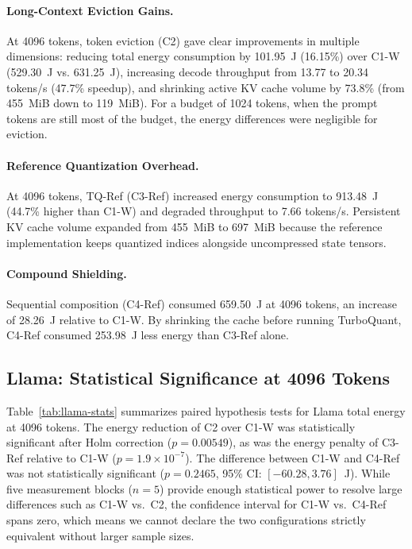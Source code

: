 \documentclass[sigconf,nonacm]{acmart}
\begin{document}
\paragraph{Long-Context Eviction Gains.}
At 4096 tokens, token eviction (C2) gave clear improvements in multiple dimensions: reducing total energy consumption by 101.95~J (16.15\%) over C1-W (529.30~J vs. 631.25~J), increasing decode throughput from 13.77 to 20.34 tokens/s (47.7\% speedup), and shrinking active KV cache volume by 73.8\% (from 455~MiB down to 119~MiB). For a budget of 1024 tokens, when the prompt tokens are still most of the budget, the energy differences were negligible for eviction.

\paragraph{Reference Quantization Overhead.}
At 4096 tokens, TQ-Ref (C3-Ref) increased energy consumption to 913.48~J (44.7\% higher than C1-W) and degraded throughput to 7.66 tokens/s. Persistent KV cache volume expanded from 455~MiB to 697~MiB because the reference implementation keeps quantized indices alongside uncompressed state tensors.

\paragraph{Compound Shielding.}
Sequential composition (C4-Ref) consumed 659.50~J at 4096 tokens, an increase of 28.26~J relative to C1-W. By shrinking the cache before running TurboQuant, C4-Ref consumed 253.98~J less energy than C3-Ref alone.

\subsection{Llama: Statistical Significance at 4096 Tokens}

Table~\ref{tab:llama-stats} summarizes paired hypothesis tests for Llama total energy at 4096 tokens. The energy reduction of C2 over C1-W was statistically significant after Holm correction ($p = 0.00549$), as was the energy penalty of C3-Ref relative to C1-W ($p = 1.9 \times 10^{-7}$). The difference between C1-W and C4-Ref was not statistically significant ($p = 0.2465$, 95\% CI: $[-60.28, 3.76]$~J). While five measurement blocks ($n=5$) provide enough statistical power to resolve large differences such as C1-W vs.\ C2, the confidence interval for C1-W vs.\ C4-Ref spans zero, which means we cannot declare the two configurations strictly equivalent without larger sample sizes.
\end{document}
